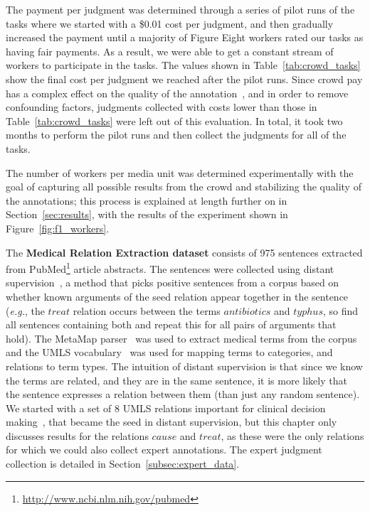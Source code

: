 The payment per judgment was determined through a series of pilot runs of the tasks where we started with a \$0.01 cost per judgment, and then gradually increased the payment until a majority of Figure Eight workers rated our tasks as having fair payments. As a result, we were able to get a constant stream of workers to participate in the tasks. The values shown in Table~\ref{tab:crowd_tasks} show the final cost per judgment we reached after the pilot runs. Since crowd pay has a complex effect on the quality of the annotation~\cite{mao2013volunteering}, and in order to remove confounding factors, judgments collected with costs lower than those in Table~\ref{tab:crowd_tasks} were left out of this evaluation. In total, it took two months to perform the pilot runs and then collect the judgments for all of the tasks.

The number of workers per media unit was determined experimentally with the goal of capturing all possible results from the crowd and stabilizing the quality of the annotations; this process is explained at length further on in Section~\ref{sec:results}, with the results of the experiment shown in Figure~\ref{fig:f1_workers}.

The \textbf{Medical Relation Extraction dataset} consists of 975 sentences extracted from PubMed\footnote{\url{http://www.ncbi.nlm.nih.gov/pubmed}} article abstracts. The sentences were collected using distant supervision~\cite{mintz2009distant}, a method that picks positive sentences from a corpus based on whether known arguments of the seed relation appear together in the sentence (\emph{e.g.}, the $treat$ relation occurs between the terms $antibiotics$ and $typhus$, so find all sentences containing both and repeat this for all pairs of arguments that hold). The MetaMap parser~\cite{aronson2001effective} was used to extract medical terms from the corpus and the UMLS vocabulary~\cite{bodenreider2004unified} was used for mapping terms to categories, and relations to term types. The intuition of distant supervision is that since we know the terms are related, and they are in the same sentence, it is more likely that the sentence expresses a relation between them (than just any random sentence). We started with a set of 8 UMLS relations important for clinical decision making~\cite{P14-1078}, that became the seed in distant supervision, but this chapter only discusses results for the relations $cause$ and $treat$, as these were the only relations for which we could also collect expert annotations. The expert judgment collection is detailed in Section~\ref{subsec:expert_data}.

